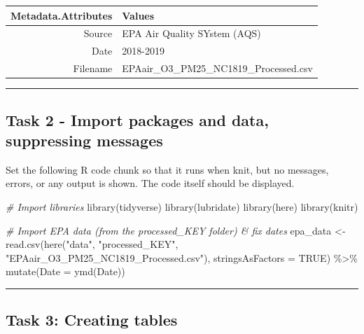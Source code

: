 \documentclass[
]{article}
\newenvironment{Shaded}{\begin{snugshade}}{\end{snugshade}}
\newcommand{\AttributeTok}[1]{\textcolor[rgb]{0.77,0.63,0.00}{#1}}
\newcommand{\CommentTok}[1]{\textcolor[rgb]{0.56,0.35,0.01}{\textit{#1}}}
\newcommand{\ConstantTok}[1]{\textcolor[rgb]{0.00,0.00,0.00}{#1}}
\newcommand{\FunctionTok}[1]{\textcolor[rgb]{0.00,0.00,0.00}{#1}}
\newcommand{\NormalTok}[1]{#1}
\newcommand{\OtherTok}[1]{\textcolor[rgb]{0.56,0.35,0.01}{#1}}
\newcommand{\SpecialCharTok}[1]{\textcolor[rgb]{0.00,0.00,0.00}{#1}}
\newcommand{\StringTok}[1]{\textcolor[rgb]{0.31,0.60,0.02}{#1}}
\begin{document}
\begin{longtable}{rl}
\toprule
Metadata.Attributes & Values \\ 
\midrule
Source & EPA Air Quality SYstem (AQS) \\ 
Date & 2018-2019 \\ 
Filename & EPAair\_O3\_PM25\_NC1819\_Processed.csv \\ 
\bottomrule
\end{longtable}

\begin{center}\rule{0.5\linewidth}{0.5pt}\end{center}

\hypertarget{task-2---import-packages-and-data-suppressing-messages}{%
\subsection{Task 2 - Import packages and data, suppressing
messages}\label{task-2---import-packages-and-data-suppressing-messages}}

Set the following R code chunk so that it runs when knit, but no
messages, errors, or any output is shown. The code itself should be
displayed.

\begin{Shaded}
\begin{Highlighting}[]
\CommentTok{\# Import libraries}
\FunctionTok{library}\NormalTok{(tidyverse)}
\FunctionTok{library}\NormalTok{(lubridate)}
\FunctionTok{library}\NormalTok{(here)}
\FunctionTok{library}\NormalTok{(knitr)}

\CommentTok{\# Import EPA data (from the processed\_KEY folder) \& fix dates}
\NormalTok{epa\_data }\OtherTok{\textless{}{-}} \FunctionTok{read.csv}\NormalTok{(}\FunctionTok{here}\NormalTok{(}\StringTok{"data"}\NormalTok{, }\StringTok{"processed\_KEY"}\NormalTok{, }\StringTok{"EPAair\_O3\_PM25\_NC1819\_Processed.csv"}\NormalTok{),}
    \AttributeTok{stringsAsFactors =} \ConstantTok{TRUE}\NormalTok{) }\SpecialCharTok{\%\textgreater{}\%}
    \FunctionTok{mutate}\NormalTok{(}\AttributeTok{Date =} \FunctionTok{ymd}\NormalTok{(Date))}
\end{Highlighting}
\end{Shaded}

\begin{center}\rule{0.5\linewidth}{0.5pt}\end{center}

\hypertarget{task-3-creating-tables}{%
\subsection{Task 3: Creating tables}\label{task-3-creating-tables}}
\end{document}
